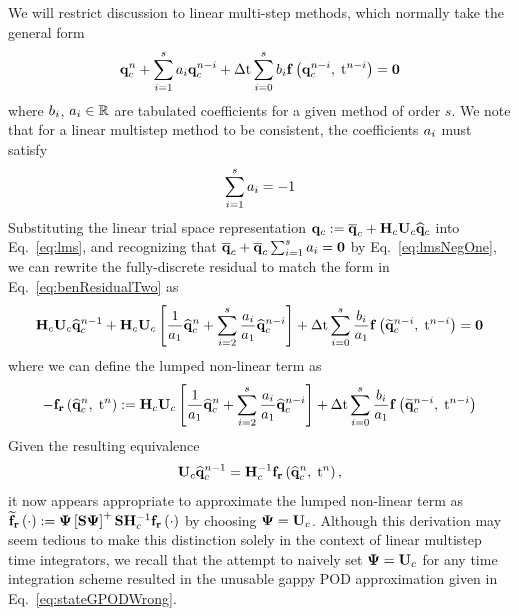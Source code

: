 We will restrict discussion to linear multi-step methods, which normally take the general form
%
\begin{equation}\label{eq:lms}
	\mathbf{q}_{c}^{n} + \sum_{i=1}^{s} a_{i} \mathbf{q}_{c}^{n-i} + \Delta \text{t} \sum_{i=0}^{s} b_{i} \mathbf{f} \left(\mathbf{q}_{c}^{n-i}, \; \text{t}^{n-i}\right) = \mathbf{0}
\end{equation}
%
where $b_{i}$, $a_{i} \in \mathbb{R}$ are tabulated coefficients for a given method of order $s$. We note that for a linear multistep method to be consistent, the coefficients $a_{i}$ must satisfy
%
\begin{equation}\label{eq:lmsNegOne}
	\sum_{i=1}^{s} a_{i} = -1
\end{equation}
%
Substituting the linear trial space representation $\consVec \defEq \consVecCent + \consScale \consTrial \consVecCoef$ into Eq.~\ref{eq:lms}, and recognizing that $\mathbf{\overline{q}}_{c} + \mathbf{\overline{q}}_{c} \sum_{i=1}^{s} a_{i} = \mathbf{0}$ by Eq.~\ref{eq:lmsNegOne}, we can rewrite the fully-discrete residual to match the form in Eq.~\ref{eq:benResidualTwo} as
%
\begin{equation}
	\consScale \consTrial \consVecCoef^{\timeIdx-1} + \consScale \consTrial \left[\frac{1}{a_1} \consVecCoef^{\timeIdx} + \sum_{\dummyIdx=2}^{s} \frac{a_{\dummyIdx}}{a_1} \consVecCoef^{\timeIdx-\dummyIdx}\right] + \dt \sum_{\dummyIdx=0}^{s} \frac{b_{\dummyIdx}}{a_1} \rhsFunc{\consVecRom^{\timeIdx-\dummyIdx}, \; \timeVar^{\timeIdx-\dummyIdx}} = \zeroVec
\end{equation}
%
where we can define the lumped non-linear term as
%
\begin{equation}
	-\rhsResFunc{\consVecCoef^{\timeIdx},\; \timeVar^{\timeIdx}} \defEq \consScale \consTrial \left[\frac{1}{a_1} \consVecCoef^{\timeIdx} + \sum_{\dummyIdx=2}^{s} \frac{a_{\dummyIdx}}{a_1} \consVecCoef^{\timeIdx-\dummyIdx}\right] + \dt \sum_{\dummyIdx=0}^{s} \frac{b_{\dummyIdx}}{a_1} \rhsFunc{\consVecRom^{\timeIdx-\dummyIdx}, \; \timeVar^{\timeIdx-\dummyIdx}}
\end{equation}
%
Given the resulting equivalence
%
\begin{equation}
	\consTrial \consVecCoef^{\timeIdx-1} = \consScaleInv \rhsResFunc{\consVecCoef^{\timeIdx},\; \timeVar^{\timeIdx}},
\end{equation}
%
it now appears appropriate to approximate the lumped non-linear term as $\rhsResApproxFunc{\cdot} \defEq \deimBasis \left[\sampMat \deimBasis\right]^+ \sampMat \consScaleInv \rhsResFunc{\cdot}$ by choosing $\deimBasis = \consTrial$. Although this derivation may seem tedious to make this distinction solely in the context of linear multistep time integrators, we recall that the attempt to naively set $\deimBasis = \consTrial$ for any time integration scheme resulted in the unusable gappy POD approximation given in Eq.~\ref{eq:stateGPODWrong}.

